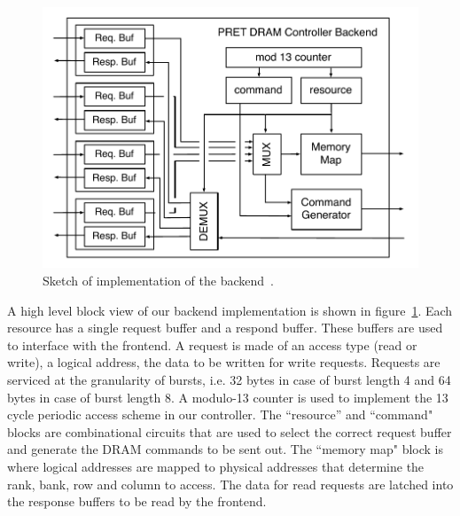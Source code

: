 \begin{figure}
\begin{center}
\vspace{-8mm}
\includegraphics[width=1.1\linewidth]{figs/dram-backend-implementation}
\end{center}
\caption{Sketch of implementation of the backend~\cite{ReinekeLiuPatelKimLee11_PRETDRAMControllerBankPrivatizationForPredictability}.}
\label{fig:dram-backend-implementation}
\end{figure}

A high level block view of our backend implementation is shown in figure~\ref{fig:dram-backend-implementation}.
Each resource has a single request buffer and a respond buffer.
These buffers are used to interface with the frontend.   
A request is made of an access type (read or write), a logical address, the data to be written for write requests. 
Requests are serviced at the granularity of bursts, i.e. 32 bytes in case of burst length 4 and 64 bytes in case of burst length 8.
A modulo-13 counter is used to implement the 13 cycle periodic access scheme in our controller.   
The ``resource'' and ``command" blocks are combinational circuits that are used to select the correct request buffer and generate the DRAM commands to be sent out. 
The ``memory map" block is where logical addresses are mapped to physical addresses that determine the rank, bank, row and column to access.
The data for read requests are latched into the response buffers to be read by the frontend.  

